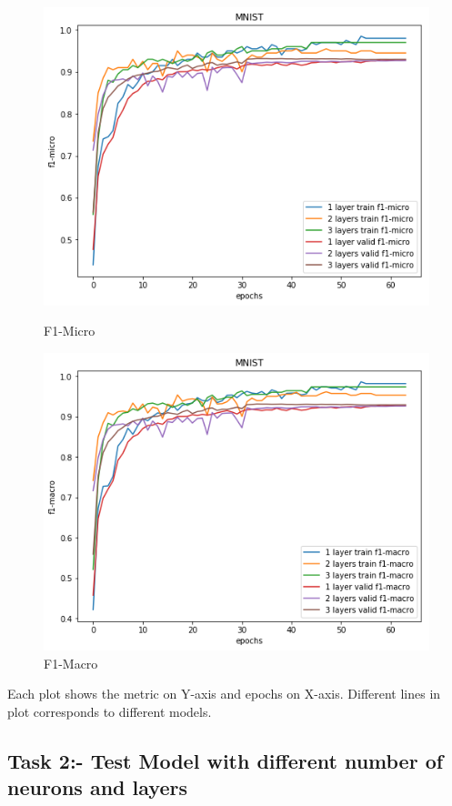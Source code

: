 \documentclass{article}
\begin{document}
\begin{figure}[!htb]
	\includegraphics[width=\linewidth]{../output_plots/part_1_task_1_f1-micro.png}
	\caption{F1-Micro}\label{fig:part_1_task_1_f1-micro}
	\endminipage
	\includegraphics[width=\linewidth]{../output_plots/part_1_task_1_f1-macro.png}
	\caption{F1-Macro}\label{fig:part_1_task_1_f1-macro}
	\endminipage
\end{figure}

Each plot shows the metric on Y-axis and epochs on X-axis. Different lines in plot corresponds to different models.

\subsection{Task 2:- Test Model with different number of neurons and layers}
\end{document}
